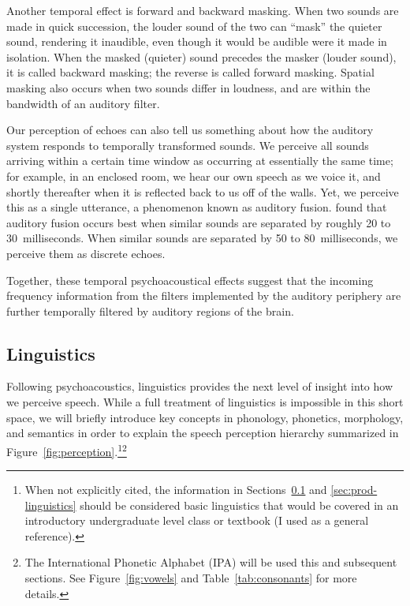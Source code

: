 Another temporal effect is forward and backward masking.
When two sounds are made in quick succession,
the louder sound of the two can
``mask'' the quieter sound,
rendering it inaudible,
even though it would be audible
were it made in isolation.
When the masked (quieter) sound
precedes the masker (louder sound),
it is called backward masking;
the reverse is called forward masking.
Spatial masking also occurs
when two sounds differ in loudness,
and are within the bandwidth
of an auditory filter.

Our perception of echoes can also tell us
something about how the auditory system
responds to temporally transformed sounds.
We perceive all sounds arriving within
a certain time window as occurring at essentially
the same time;
for example, in an enclosed room,
we hear our own speech as we voice it,
and shortly thereafter when it is reflected
back to us off of the walls.
Yet, we perceive this as a single utterance,
a phenomenon known as auditory fusion.
\citet{haas1972} found that auditory fusion occurs
best when similar sounds are separated by roughly
20 to 30~milliseconds.
When similar sounds are separated by 50 to 80~milliseconds,
we perceive them as discrete echoes.

Together, these temporal psychoacoustical effects
suggest that the incoming frequency information
from the filters implemented by the auditory periphery
are further temporally filtered
by auditory regions of the brain.

\subsection{Linguistics}
\label{sec:perc-linguistics}

Following psychoacoustics,
linguistics provides
the next level of insight into
how we perceive speech.
While a full treatment of linguistics
is impossible in this short space,
we will briefly introduce
key concepts in phonology,
phonetics, morphology, and semantics
in order to
explain the speech perception hierarchy
summarized in Figure~\ref{fig:perception}.\footnote{
  When not explicitly cited,
  the information in Sections~\ref{sec:perc-linguistics}
  and \ref{sec:prod-linguistics}
  should be considered
  basic linguistics
  that would be covered in an
  introductory undergraduate level
  class or textbook
  (I used \citet{roach2010} as a general reference).
}\footnote{The International Phonetic Alphabet (IPA)
  will be used this and subsequent sections.
  See Figure~\ref{fig:vowels} and Table~\ref{tab:consonants}
  for more details.}

